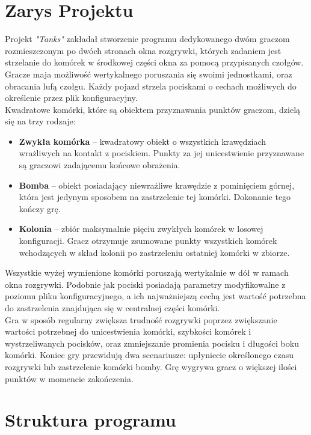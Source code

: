 \documentclass[11pt,a4paper]{report}
\begin{document}
\section{Zarys Projektu}\label{sec:tekst}
Projekt  \textsl{"Tanks"} zakładał stworzenie programu dedykowanego dwóm graczom rozmieszczonym po dwóch stronach okna rozgrywki, których zadaniem jest strzelanie do komórek w środkowej części okna za pomocą przypisanych czołgów. Gracze maja możliwość wertykalnego poruszania się swoimi jednostkami, oraz obracania lufą czołgu. Każdy pojazd strzela pociskami o cechach możliwych do określenie przez plik konfiguracyjny. \\
Kwadratowe komórki, które są obiektem przyznawania punktów graczom, dzielą się na trzy rodzaje:
\begin {itemize}
\item \textbf {Zwykła komórka} --  kwadratowy obiekt o wszystkich krawędziach wrażliwych na kontakt z pociskiem. Punkty za jej unicestwienie przyznawane są graczowi zadającemu końcowe obrażenia.
\item \textbf {Bomba} -- obiekt posiadający niewrażliwe krawędzie z pominięciem górnej, która jest jedynym sposobem na zastrzelenie tej komórki. Dokonanie tego kończy grę.
\item \textbf {Kolonia} -- zbiór maksymalnie pięciu zwykłych komórek w losowej konfiguracji. Gracz otrzymuje zsumowane punkty wszystkich komórek wchodzących w skład kolonii po zastrzeleniu ostatniej komórki w zbiorze.
\end {itemize}
Wszystkie wyżej wymienione komórki poruszają wertykalnie w dół w ramach okna rozgrywki. Podobnie jak pociski posiadają parametry modyfikowalne z poziomu pliku konfiguracyjnego, a ich najważniejszą cechą jest wartość potrzebna do zastrzelenia znajdująca się w centralnej części komórki.\\
Gra w sposób regularny zwiększa trudność rozgrywki poprzez zwiększanie wartości potrzebnej do unicestwienia komórki, szybkości komórek i wystrzeliwanych pocisków, oraz zmniejszanie promienia pocisku i długości boku komórki. Koniec gry przewidują dwa scenariusze: upłyniecie określonego czasu rozgrywki lub zastrzelenie komórki bomby. Grę wygrywa gracz o większej ilości punktów w momencie zakończenia.
\newpage
\section{Struktura programu}\label{sec:tekst}
\end{document}
